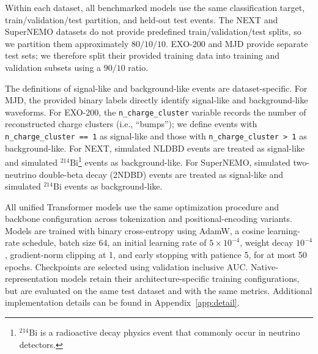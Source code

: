 Within each dataset, all benchmarked models use the same classification target, train/validation/test partition, and held-out test events. The NEXT and SuperNEMO datasets do not provide predefined train/validation/test splits, so we partition them approximately $80/10/10$. EXO-200 and MJD provide separate test sets; we therefore split their provided training data into training and validation subsets using a $90/10$ ratio.

The definitions of signal-like and background-like events are dataset-specific. For MJD, the provided binary labels directly identify signal-like and background-like waveforms. For EXO-200, the \texttt{n\_charge\_cluster} variable records the number of reconstructed charge clusters (i.e., ``bumps''); we define events with \texttt{n\_charge\_cluster == 1} as signal-like and those with \texttt{n\_charge\_cluster > 1} as background-like. For NEXT, simulated NLDBD events are treated as signal-like and simulated $^{214}\mathrm{Bi}$\footnote{$^{214}\mathrm{Bi}$ is a radioactive decay physics event that commonly occur in neutrino detectors.} events as background-like. For SuperNEMO, simulated two-neutrino double-beta decay (2NDBD) events are treated as signal-like and simulated $^{214}\mathrm{Bi}$ events as background-like.

All unified Transformer models use the same optimization procedure and backbone configuration across tokenization and positional-encoding variants. Models are trained with binary cross-entropy using AdamW, a cosine learning-rate schedule, batch size 64, an initial learning rate of $5\times10^{-4}$, weight decay $10^{-4}$, gradient-norm clipping at 1, and early stopping with patience 5, for at most 50 epochs. Checkpoints are selected using validation inclusive AUC. Native-representation models retain their architecture-specific training configurations, but are evaluated on the same test dataset and with the same metrics. Additional implementation details can be found in Appendix~\ref{app:detail}.



